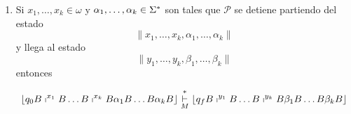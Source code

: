 \begin{frame}
  \begin{alertblock}{}
      \begin{enumerate}[3)]
        \item Si $x_{1}, \dotsc, x_{k} \in \omega$ y $\alpha_{1}, \dotsc, \alpha_{k} \in \Sigma^{\ast}$ son tales que
        $\mathcal{P}$ se detiene partiendo del estado
        \begin{equation*}
          \lVert x_{1}, \dotsc, x_{k}, \alpha_{1}, \dotsc, \alpha_{k} \rVert
        \end{equation*}
        \PN y llega al estado
        \begin{equation*}
          \lVert y_{1}, \dotsc, y_{k}, \beta_{1}, \dotsc, \beta_{k} \rVert
        \end{equation*}
        \PN entonces

        \sizeOfLetterSecond
        \begin{equation*}
          \left\lfloor q_{0} B \shortmid^{x_{1}} B \dotsc B \shortmid^{x_{k}} B \alpha_{1} B \dotsc B \alpha_{k} B
          \right\rfloor \overset{\ast}{\underset{M}{\vdash}} \left\lfloor q_{f} B \shortmid^{y_{1}} B \dotsc B
          \shortmid^{y_{k}} B \beta_{1} B \dotsc B \beta_{k} B \right\rfloor
        \end{equation*}
      \end{enumerate}
  \end{alertblock}
\end{frame}
